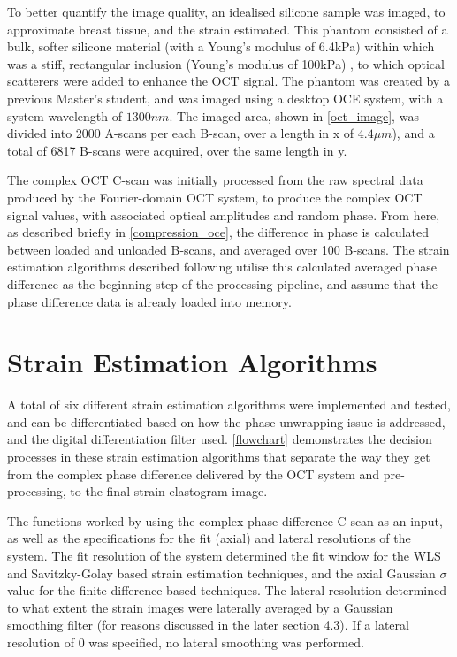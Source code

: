 To better quantify the image quality, an idealised silicone sample was imaged, to approximate breast tissue, and the strain estimated. This phantom consisted of a bulk, softer silicone material (with a Young's modulus of 6.4kPa) within which was a stiff, rectangular inclusion (Young's modulus of 100kPa) \cite{hepburn_improving_2017}, to which optical scatterers were added to enhance the OCT signal. The phantom was created by a previous Master's student, and was imaged using a desktop OCE system, with a system wavelength of $1300nm$. The imaged area, shown in \autoref{oct_image}, was divided into 2000 A-scans per each B-scan, over a length in x of $4.4\mu m$), and a total of 6817 B-scans were acquired, over the same length in y.

The complex OCT C-scan was initially processed from the raw spectral data produced by the Fourier-domain OCT system, to produce the complex OCT signal values, with associated optical amplitudes and random phase. From here, as described briefly in \autoref{compression_oce}, the difference in phase is calculated between loaded and unloaded B-scans, and averaged over 100 B-scans. The strain estimation algorithms described following utilise this calculated averaged phase difference as the beginning step of the processing pipeline, and assume that the phase difference data is already loaded into memory.

\section{Strain Estimation Algorithms}\label{algorithms}

A total of six different strain estimation algorithms were implemented and tested, and can be differentiated based on how the phase unwrapping issue is addressed, and the digital differentiation filter used. \autoref{flowchart} demonstrates the decision processes in these strain estimation algorithms that separate the way they get from the complex phase difference delivered by the OCT system and pre-processing, to the final strain elastogram image.

The functions worked by using the complex phase difference C-scan as an input, as well as the specifications for the fit (axial) and lateral resolutions of the system. The fit resolution of the system determined the fit window for the WLS and Savitzky-Golay based strain estimation techniques, and the axial Gaussian $\sigma$ value for the finite difference based techniques. The lateral resolution determined to what extent the strain images were laterally averaged by a Gaussian smoothing filter (for reasons discussed in the later section 4.3). If a lateral resolution of 0 was specified, no lateral smoothing was performed. 

